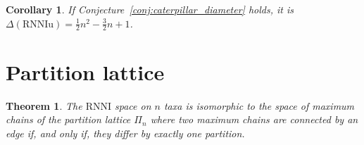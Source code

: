 \documentclass[11pt, a4paper]{article}
\newcommand{\rnni}{\mathrm{RNNI}}
\newcommand{\rnniu}{\mathrm{RNNIu}}
\newtheorem{theorem}[definition]{Theorem}
\newtheorem{corollary}[definition]{Corollary}
\begin{document}
\begin{corollary}
	If Conjecture~\ref{conj:caterpillar_diameter} holds, it is $\Delta(\rnniu) = \frac{1}{2}n^2-\frac{3}{2}n+1$.
\end{corollary}

\section{Partition lattice}


\begin{theorem}
	The $\rnni$ space on $n$ taxa is isomorphic to the space of maximum chains of the partition lattice $\Pi_n$ where two maximum chains are connected by an edge if, and only if, they differ by exactly one partition.
\end{theorem}



\end{document}
